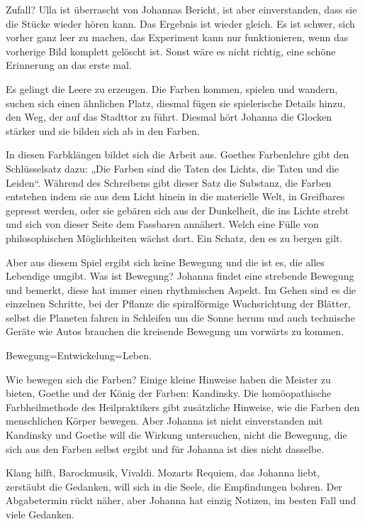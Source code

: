 \documentclass[10pt,titlepage,a5paper]{book}
\begin{document}
Zufall? Ulla ist überrascht von Johannas Bericht, ist aber einverstanden, dass sie die Stücke wieder hören kann. Das Ergebnis ist wieder gleich. Es ist schwer, sich vorher ganz leer zu machen, das Experiment kann nur funktionieren, wenn das vorherige Bild komplett gelöscht ist. Sonst wäre es nicht richtig, eine schöne Erinnerung an das erste mal.

Es gelingt die Leere zu erzeugen. Die Farben kommen, spielen und wandern, suchen sich einen ähnlichen Platz, diesmal fügen sie spielerische Details hinzu, den Weg, der auf das Stadttor zu führt. Diesmal hört Johanna die Glocken stärker und sie bilden sich ab in den Farben.

In diesen Farbklängen bildet sich die Arbeit aus. Goethes Farbenlehre gibt den Schlüsselsatz dazu: „Die Farben sind die Taten des Lichts, die Taten und die Leiden“. Während des Schreibens gibt dieser Satz die Substanz, die Farben entstehen indem sie aus dem Licht hinein in die materielle Welt, in Greifbares gepresst werden, oder sie gebären sich aus der Dunkelheit, die ins Lichte strebt und sich von dieser Seite dem Fassbaren annähert. Welch eine Fülle von philosophischen Möglichkeiten wächst dort. Ein Schatz, den es zu bergen gilt.

Aber aus diesem Spiel ergibt sich keine Bewegung und die ist es, die alles Lebendige umgibt. Was ist Bewegung? Johanna findet eine strebende Bewegung und bemerkt, diese hat immer einen rhythmischen Aspekt. Im Gehen sind es die einzelnen Schritte, bei der Pflanze die spiralförmige Wuchsrichtung der Blätter, selbst die Planeten fahren in Schleifen um die Sonne herum und auch technische Geräte wie Autos brauchen die kreisende Bewegung um vorwärts zu kommen.

Bewegung=Entwickelung=Leben.

Wie bewegen sich die Farben? Einige kleine Hinweise haben die Meister zu bieten, Goethe und der König der Farben: Kandinsky. Die homöopathische Farbheilmethode des Heilpraktikers gibt zusätzliche Hinweise, wie die Farben den menschlichen Körper bewegen. Aber Johanna ist nicht einverstanden mit Kandinsky und Goethe will die Wirkung untersuchen, nicht die Bewegung, die sich aus den Farben selbst ergibt und für Johanna ist dies nicht dasselbe. 

Klang hilft, Barockmusik, Vivaldi. Mozarts Requiem, das Johanna liebt, zerstäubt die Gedanken, will sich in die Seele, die Empfindungen bohren. 
Der Abgabetermin rückt näher, aber Johanna hat einzig Notizen, im besten Fall und viele Gedanken.
\end{document}
